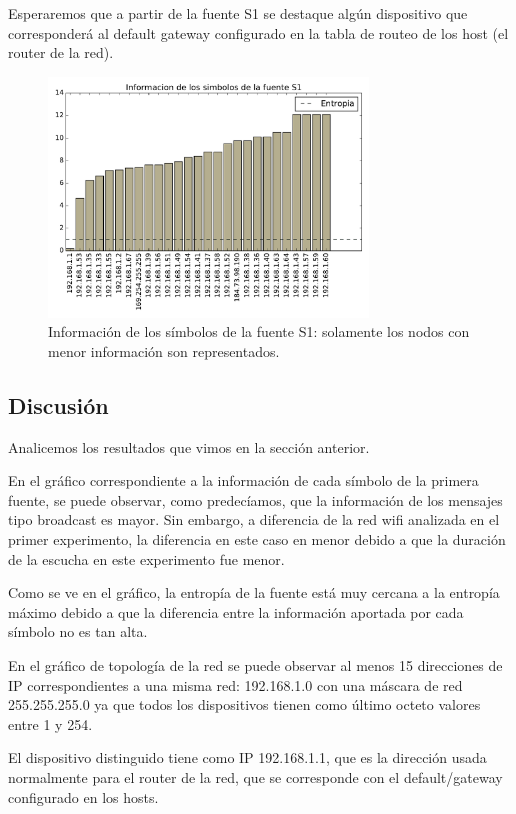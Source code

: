Esperaremos que a partir de la fuente S1 se destaque algún dispositivo que corresponderá al default gateway configurado en la tabla de routeo de los host (el router de la red).

\begin{figure}[H]
  \centering
  \includegraphics[width=8.5cm]{exp_empresa/grafico3.pdf}
  \caption{ \normalfont Información de los símbolos de la fuente S1: solamente los nodos con menor información son representados.}
\end{figure}

\subsection{Discusión}

Analicemos los resultados que vimos en la sección anterior.

En el gráfico correspondiente a la información de cada símbolo de la primera fuente, se puede observar, como predecíamos, que la información de los mensajes tipo broadcast es mayor. Sin embargo, a diferencia de la red wifi analizada en el primer experimento, la diferencia en este caso en menor debido a que la duración de la escucha en este experimento fue menor.

Como se ve en el gráfico, la entropía de la fuente está muy cercana a la entropía máximo debido a que la diferencia entre la información aportada por cada símbolo no es tan alta.

En el gráfico de topología de la red se puede observar al menos 15 direcciones de IP correspondientes a una misma red: 192.168.1.0 con una máscara de red 255.255.255.0 ya que todos los dispositivos tienen como último octeto valores entre 1 y 254. 

El dispositivo distinguido tiene como IP 192.168.1.1, que es la dirección usada normalmente para el router de la red, que se corresponde con el default/gateway configurado en los hosts.

